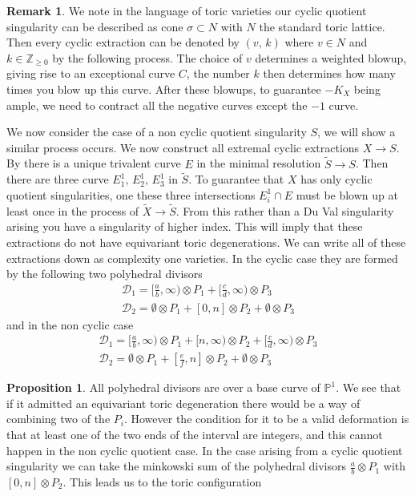 \documentclass[11pt]{amsart}
\theoremstyle{definition}
\theoremstyle{definition}
\theoremstyle{definition}
\newtheorem{prop}[thm]{Proposition}
\theoremstyle{definition}
\theoremstyle{definition}
\theoremstyle{definition}
\theoremstyle{definition}
\theoremstyle{definition}
\newtheorem*{rem}{Remark}
\newcommand{\ra}{\rightarrow}
\newcommand{\wt}[1]{\widetilde{#1}}
\begin{document}
\begin{rem}
We note in the language of toric varieties our cyclic quotient singularity can be described as cone $\sigma \subset N$ with $N$ the standard toric lattice. Then every cyclic extraction can be denoted by $(v, \, k)$ where $v \in N$ and $k \in \mathbb{Z}_{\geq 0}$ by the following process. The choice of $v$ determines a weighted blowup, giving rise to an exceptional curve $C$, the number $k$ then determines how many times you blow up this curve. After these blowups, to guarantee $-K_X$ being ample, we need to contract all the negative curves except the $-1$ curve.
\end{rem}

We now consider the case of a non cyclic quotient singularity $S$, we will show a similar process occurs. We now construct all extremal cyclic extractions $X \ra S$. By \cite{Br} there is a unique trivalent curve $E$ in the minimal resolution $\wt{S} \ra S$. Then there are three curve $E_1^1, \, E_2^1, \, E_3^1$  in $\wt{S}$. To guarantee that $X$ has only cyclic quotient singularities, one these three intersections $E_i^1 \cap E$ must be blown up at least once in the process of $\wt{X} \ra \wt{S}$. From this rather than a Du Val singularity arising you have a singularity of higher index. This will imply that these extractions do not have equivariant toric degenerations. We can write all of these extractions down as complexity one varieties. In the cyclic case they are formed by the following two polyhedral divisors 
\[
\begin{array}{l}
\mathcal{D}_1 = [\frac{a}{b}, \infty) \otimes P_1 + [\frac{c}{d}, \infty) \otimes P_3 \\
\mathcal{D}_2 =  \emptyset \otimes P_1 + [0, n] \otimes P_2 + \emptyset \otimes P_3
\end{array}
\]
and in the non cyclic case 
\[
\begin{array}{l}
\mathcal{D}_1 = [\frac{a}{b}, \infty) \otimes P_1 + [n, \infty) \otimes P_2 + [\frac{c}{d}, \infty) \otimes P_3 \\
\mathcal{D}_2 =  \emptyset \otimes P_1 + [\frac{e}{f}, n] \otimes P_2 + \emptyset \otimes P_3
\end{array}
\]
\begin{prop}
All polyhedral divisors are over a base curve of $\mathbb{P}^1$. We see that if it admitted an equivariant toric degeneration there would be a way of combining two of the $P_i$. However the condition for it to be a valid deformation is that at least one of the two ends of the interval are integers, and this cannot happen in the non cyclic quotient case. In the case arising from a cyclic quotient singularity we can take the minkowski sum of the polyhedral divisors $\frac{a}{b} \otimes P_1$ with $[0, n] \otimes P_2$. This leads us to the toric configuration 
\end{prop}
\end{document}
